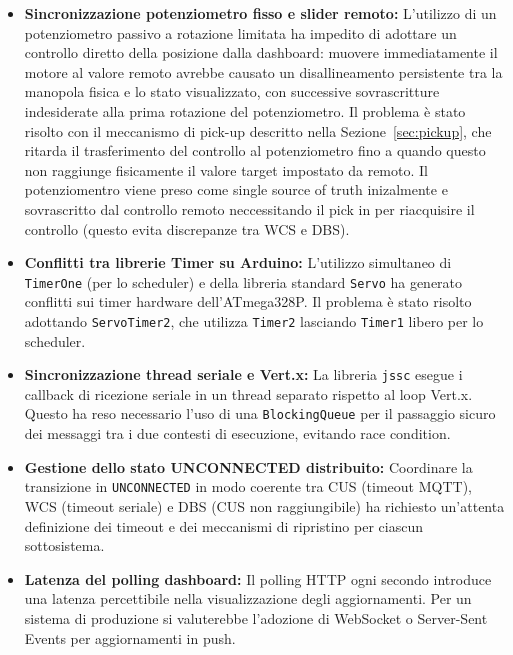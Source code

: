 \documentclass[12pt, a4paper]{article}
\begin{document}
\begin{itemize}
    \item \textbf{Sincronizzazione potenziometro fisso e slider remoto:} L'utilizzo di un potenziometro passivo a rotazione limitata ha impedito di adottare un controllo diretto della posizione dalla dashboard: muovere immediatamente il motore al valore remoto avrebbe causato un disallineamento persistente tra la manopola fisica e lo stato visualizzato, con successive sovrascritture indesiderate alla prima rotazione del potenziometro. Il problema è stato risolto con il meccanismo di pick-up descritto nella Sezione~\ref{sec:pickup}, che ritarda il trasferimento del controllo al potenziometro fino a quando questo non raggiunge fisicamente il valore target impostato da remoto. Il potenziomentro viene preso come single source of truth inizalmente e sovrascritto dal controllo remoto neccessitando il pick in per riacquisire il controllo (questo evita discrepanze tra WCS e DBS).

    \item \textbf{Conflitti tra librerie Timer su Arduino:} L'utilizzo simultaneo di \texttt{TimerOne} (per lo scheduler) e della libreria standard \texttt{Servo} ha generato conflitti sui timer hardware dell'ATmega328P. Il problema è stato risolto adottando \texttt{ServoTimer2}, che utilizza \texttt{Timer2} lasciando \texttt{Timer1} libero per lo scheduler.

    \item \textbf{Sincronizzazione thread seriale e Vert.x:} La libreria \texttt{jssc} esegue i callback di ricezione seriale in un thread separato rispetto al loop Vert.x. Questo ha reso necessario l'uso di una \texttt{BlockingQueue} per il passaggio sicuro dei messaggi tra i due contesti di esecuzione, evitando race condition.

    \item \textbf{Gestione dello stato UNCONNECTED distribuito:} Coordinare la transizione in \texttt{UNCONNECTED} in modo coerente tra CUS (timeout MQTT), WCS (timeout seriale) e DBS (CUS non raggiungibile) ha richiesto un'attenta definizione dei timeout e dei meccanismi di ripristino per ciascun sottosistema.

    \item \textbf{Latenza del polling dashboard:} Il polling HTTP ogni secondo introduce una latenza percettibile nella visualizzazione degli aggiornamenti. Per un sistema di produzione si valuterebbe l'adozione di WebSocket o Server-Sent Events per aggiornamenti in push.
\end{itemize}
\end{document}
